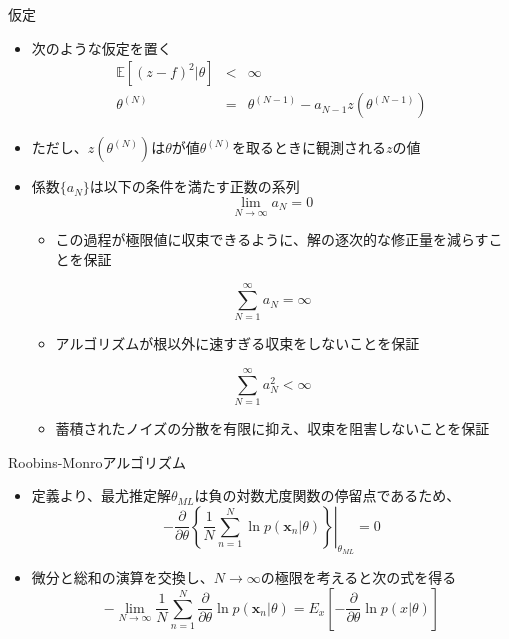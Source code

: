 \begin{frame}{仮定}
 \begin{itemize}
  \item 次のような仮定を置く
        \begin{eqnarray}
         \mathbb{E}[(z-f)^2|\theta] &<& \infty\\
         \theta^{(N)}&=& \theta^{(N-1)}-a_{N-1}z(\theta^{(N-1)})
        \end{eqnarray}
  \item ただし、$z(\theta^{(N)})$は$\theta$が値$\theta^{(N)}$を取るときに観測される$z$の値
  \item 係数$\{a_N\}$は以下の条件を満たす正数の系列
        \begin{equation}
         \lim_{N \rightarrow \infty}a_N=0
        \end{equation}
        \begin{itemize}
         \item この過程が極限値に収束できるように、解の逐次的な修正量を減らすことを保証
        \end{itemize}
        \begin{equation}
         \sum_{N=1}^{\infty}a_N=\infty
        \end{equation}
        \begin{itemize}
         \item アルゴリズムが根以外に速すぎる収束をしないことを保証
        \end{itemize}
        \begin{equation}
         \sum_{N=1}^{\infty}a_N^2 < \infty
        \end{equation}
        \begin{itemize}
         \item 蓄積されたノイズの分散を有限に抑え、収束を阻害しないことを保証
        \end{itemize}
 \end{itemize}
\end{frame}

\begin{frame}{Roobins-Monroアルゴリズム}
 \begin{itemize}
  \item 定義より、最尤推定解$\theta_{ML}$は負の対数尤度関数の停留点であるため、
        \begin{equation}
         -\frac{\partial }{\partial \theta}\left\{\left.\frac{1}{N}\sum_{n=1}^{N}\ln  p(\bm{x}_n|\theta)\right\}\right|_{\theta_{ML}} = 0
        \end{equation}
  \item 微分と総和の演算を交換し、$N\rightarrow\infty$の極限を考えると次の式を得る
        \begin{equation}
         -\lim_{N \rightarrow \infty}\frac{1}{N}\sum_{n=1}^{N}\frac{\partial}{\partial \theta}\ln p(\bm{x}_n|\theta)=E_x\left[-\frac{\partial}{\partial \theta}\ln p(x|\theta)\right]
        \end{equation}
 \end{itemize}
\end{frame}

